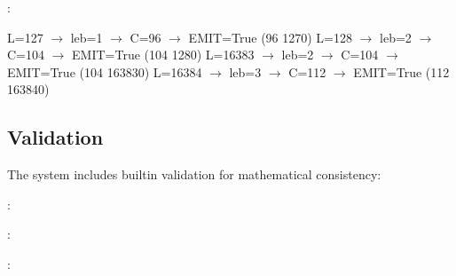\documentclass[letterpaper,10pt,english]{sphinxmanual}
\begin{document}
\sphinxAtStartPar
{}:

\begin{sphinxVerbatim}[commandchars=\\\{\}]
L=127    \(\rightarrow\) leb=1 \(\rightarrow\) C=96   \(\rightarrow\) EMIT=True  (96 \PYGZlt{} 1270)
L=128    \(\rightarrow\) leb=2 \(\rightarrow\) C=104  \(\rightarrow\) EMIT=True  (104 \PYGZlt{} 1280)
L=16383  \(\rightarrow\) leb=2 \(\rightarrow\) C=104  \(\rightarrow\) EMIT=True  (104 \PYGZlt{} 163830)
L=16384  \(\rightarrow\) leb=3 \(\rightarrow\) C=112  \(\rightarrow\) EMIT=True  (112 \PYGZlt{} 163840)
\end{sphinxVerbatim}


\subsection{Validation}
\label{\detokenize{quickstart:validation}}
\sphinxAtStartPar
The system includes built\sphinxhyphen{}in validation for mathematical consistency:

\sphinxAtStartPar
{}:

\begin{sphinxVerbatim}[commandchars=\\\{\}]
  
\end{sphinxVerbatim}

\sphinxAtStartPar
{}:

\begin{sphinxVerbatim}[commandchars=\\\{\}]
\end{sphinxVerbatim}

\sphinxAtStartPar
{}:

\begin{sphinxVerbatim}[commandchars=\\\{\}]
    
\end{sphinxVerbatim}
\end{document}
